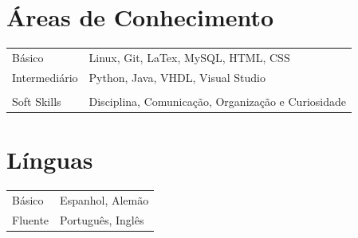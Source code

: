 \documentclass[a4paper,12pt]{article}
\begin{document}

\section{Áreas de Conhecimento}
\begin{tabularx}{\linewidth}{@{}l X@{}}
Básico &  \normalsize{Linux, Git, LaTex, MySQL, HTML, CSS}\\
Intermediário  &  \normalsize{Python, Java, VHDL, Visual Studio}\\
&\\
Soft Skills & \normalsize{Disciplina, Comunicação, Organização e Curiosidade}
\end{tabularx}

\section{Línguas}
\begin{tabularx}{\linewidth}{@{}l X@{}}
Básico &  \normalsize{Espanhol, Alemão}\\
Fluente  &  \normalsize{Português, Inglês}\\  
\end{tabularx}

\vfill
{}
\end{document}
